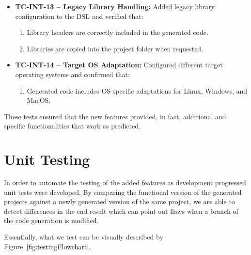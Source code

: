 \begin{itemize}
	\item \textbf{TC-INT-13 – Legacy Library Handling:} Added legacy library configuration to the DSL and verified that:
	\begin{enumerate}
		\item Library headers are correctly included in the generated code.
		\item Libraries are copied into the project folder when requested.
	\end{enumerate}
	
	\item \textbf{TC-INT-14 – Target OS Adaptation:} Configured different target operating systems and confirmed that:
	\begin{enumerate}
		\item Generated code includes OS-specific adaptations for Linux, Windows, and MacOS.
	\end{enumerate}
\end{itemize}

These tests ensured that the new features provided, in fact, additional and specific functionalities that work as predicted.


\section{Unit Testing}
\label{sec:test_unit}

In order to automate the testing of the added features as development progressed unit tests were developed. By comparing the functional version of the generated projects against a newly generated version of the same project, we are able to detect differences in the end result which can point out flaws when a branch of the code generation is modified. 

Essentially, what we test can be visually described by Figure~\ref{fig:testingFlowchart}.

